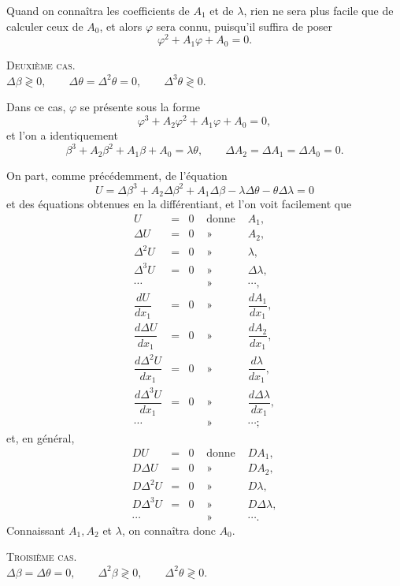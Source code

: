 \documentclass[11pt]{article}
\begin{document}
Quand on connaîtra les coefficients de $A_1$ et de $\lambda$, rien ne sera plus facile que de calculer ceux de $A_0$, et alors $\varphi$ sera connu, puisqu’il suffira de poser
\[
\varphi^2+A_1\varphi+A_0=0.
\]

\begin{center}
{\scshape Deuxième cas.}\\[0.3em]
$\Delta\beta\gtrless0,\qquad \Delta\theta=\Delta^2\theta=0,\qquad \Delta^3\theta\gtrless0.$
\end{center}

Dans ce cas, $\varphi$ se présente sous la forme
\[
\varphi^3+A_2\varphi^2+A_1\varphi+A_0=0,
\]
et l’on a identiquement
\[
\beta^3+A_2\beta^2+A_1\beta+A_0=\lambda\theta,
\qquad
\Delta A_2=\Delta A_1=\Delta A_0=0.
\]

On part, comme précédemment, de l’équation
\[
U=\Delta\beta^3+A_2\Delta\beta^2+A_1\Delta\beta-\lambda\Delta\theta-\theta\Delta\lambda=0
\]
et des équations obtenues en la différentiant, et l’on voit facilement que
\[
\begin{array}{rclcl}
U&=&0&\text{ donne }&A_1,\\
\Delta U&=&0&\text{ » }&A_2,\\
\Delta^2 U&=&0&\text{ » }&\lambda,\\
\Delta^3 U&=&0&\text{ » }&\Delta\lambda,\\
\cdots&&&\text{ » }&\cdots,\\[0.2em]
\dfrac{dU}{dx_1}&=&0&\text{ » }&\dfrac{dA_1}{dx_1},\\[0.2em]
\dfrac{d\Delta U}{dx_1}&=&0&\text{ » }&\dfrac{dA_2}{dx_1},\\[0.2em]
\dfrac{d\Delta^2 U}{dx_1}&=&0&\text{ » }&\dfrac{d\lambda}{dx_1},\\[0.2em]
\dfrac{d\Delta^3 U}{dx_1}&=&0&\text{ » }&\dfrac{d\Delta\lambda}{dx_1},\\
\cdots&&&\text{ » }&\cdots;
\end{array}
\]
et, en général,
\[
\begin{array}{rclcl}
DU&=&0&\text{ donne }&DA_1,\\
D\Delta U&=&0&\text{ » }&DA_2,\\
D\Delta^2 U&=&0&\text{ » }&D\lambda,\\
D\Delta^3 U&=&0&\text{ » }&D\Delta\lambda,\\
\cdots&&&\text{ » }&\cdots.
\end{array}
\]
Connaissant $A_1,A_2$ et $\lambda$, on connaîtra donc $A_0$.

\begin{center}
{\scshape Troisième cas.}\\[0.3em]
$\Delta\beta=\Delta\theta=0,\qquad \Delta^2\beta\gtrless0,\qquad \Delta^2\theta\gtrless0.$
\end{center}
\end{document}
